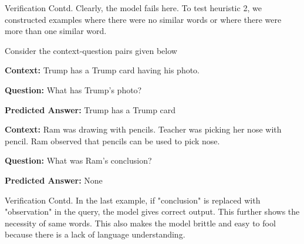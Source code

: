 \documentclass[10pt]{beamer}
\begin{document}
\begin{frame}{Verification Contd.}
Clearly, the model fails here. To test heuristic 2, we constructed examples where there were no similar words or where there were more than one similar word.

Consider the context-question pairs given below 

\textbf{Context: }Trump has a Trump card having his photo.

\textbf{Question: }What has Trump's photo?

\textbf{Predicted Answer: }Trump has a Trump card

\textbf{Context: }Ram was drawing with pencils. Teacher was picking her nose with pencil. Ram observed that pencils can be used to pick nose.

\textbf{Question: }What was Ram's conclusion?

\textbf{Predicted Answer: }None
\end{frame}

\begin{frame}{Verification Contd.}
In the last example, if "conclusion" is replaced with "observation" in the query, the model gives correct output. This further shows the necessity of same words. This also makes the model brittle and easy to fool because there is a lack of language understanding.
\end{frame}
\end{document}

